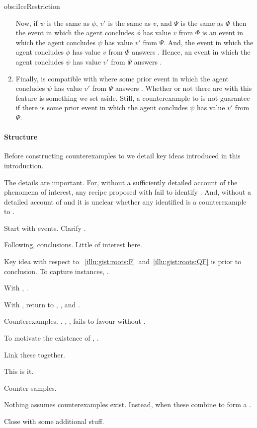 \begin{note}
\begin{motivation}{obs:iIceRestriction}
\begin{enumerate}
    Now, if \(\psi\) is the same as \(\phi\), \(v'\) is the same as \(v\), and \(\Psi\) is the same as \(\Phi\) then the event in which the agent concludes \(\phi\) has value \(v\) from \(\Phi\) is an event in which the agent concludes \(\psi\) has value \(v'\) from \(\Psi\).
    And, the event in which the agent concludes \(\phi\) has value \(v\) from \(\Phi\) answers \qHow{}.
    Hence, an event in which the agent concludes \(\psi\) has value \(v'\) from \(\Psi\) answers \qHow{}.
  \item
    Finally, \qHow{} is compatible with  where some prior event in which the agent concludes \(\psi\) has value \(v'\) from \(\Psi\) answers \qHow{}.
    Whether or not there are  with this feature is something we set aside.
    Still, a counterexample to \issueInclusion{} is not guarantee if there is some prior event in which the agent concludes \(\psi\) has value \(v'\) from \(\Psi\).
  \end{enumerate}
  \vspace{-\baselineskip}
  \end{motivation}
\end{note}


\paragraph*{Structure}


\begin{note}
  Before constructing counterexamples to \issueInclusion{} we detail key ideas introduced in this introduction.

  The details are important.
  For, without a sufficiently detailed account of the phenomena of interest, any recipe proposed with fail to identify .
  And, without a detailed account of \qWhy{} and \qHow{} it is unclear whether any identified  is a counterexample to \issueInclusion{}.

  Start with events.
  Clarify \qWhy{}.

  Following, conclusions.
  Little of interest here.

  Key idea with respect to ~\ref{illu:gist:roots:F}~and~\ref{illu:gist:roots:QF} is \ros{} prior to conclusion.
  To capture instances, .

  With , .

  With , return to \qWhy{}, \qHow{}, and \issueInclusion{}.

  Counterexamples.
  .
  , , fails to favour without .

  To motivate the existence of , \tC{}.

  Link these together.

  This is it.

  Counter-samples.

  Nothing assumes counterexamples exist.
  Instead, when these combine to form a \scen{}.

  Close with some additional stuff.
\end{note}


